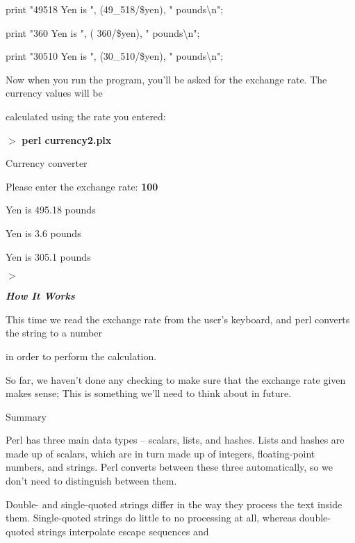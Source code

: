 \documentclass[a4paper,11pt]{book}
\begin{document}
\noindent print "49518 Yen is ", (49\_518/\$yen), " pounds\textbackslash n";

\noindent print "360 Yen is ", ( 360/\$yen), " pounds\textbackslash n";

\noindent print "30510 Yen is ", (30\_510/\$yen), " pounds\textbackslash n";

\noindent 

\noindent 

\noindent Now when you run the program, you'll be asked for the exchange rate. The currency values will be

\noindent calculated using the rate you entered:

\noindent 

\noindent $>$ \textbf{perl currency2.plx}

\noindent Currency converter

\noindent 

\noindent Please enter the exchange rate: \textbf{100}

 Yen is 495.18 pounds

 Yen is 3.6 pounds

 Yen is 305.1 pounds

\noindent $>$

\noindent 

\noindent \textbf{\textit{How It Works}}

\noindent This time we read the exchange rate from the user's keyboard, and perl converts the string to a number

\noindent in order to perform the calculation.

\noindent 

\noindent So far, we haven't done any checking to make sure that the exchange rate given makes sense; This is something we'll need to think about in future.

\noindent 

\noindent 

\noindent Summary

\noindent 

\noindent Perl has three main data types -- scalars, lists, and hashes. Lists and hashes are made up of scalars, which are in turn made up of integers, floating-point numbers, and strings. Perl converts between these three automatically, so we don't need to distinguish between them.

\noindent 

\noindent Double- and single-quoted strings differ in the way they process the text inside them. Single-quoted strings do little to no processing at all, whereas double-quoted strings interpolate escape sequences and
\end{document}
